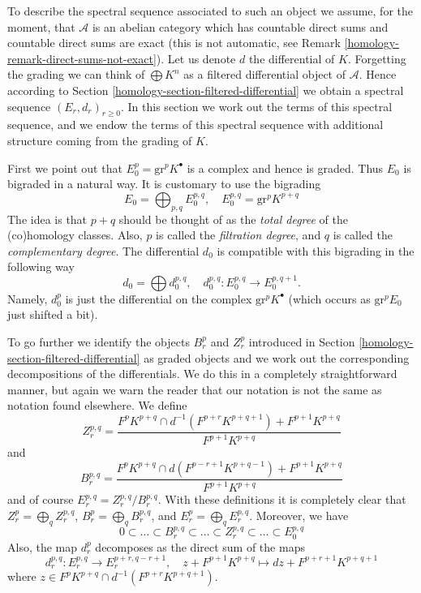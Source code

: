 \medskip\noindent
To describe the spectral sequence associated to such an object
we assume, for the moment, that $\mathcal{A}$ is an abelian category
which has countable direct sums and countable direct sums are exact
(this is not automatic, see Remark \ref{homology-remark-direct-sums-not-exact}).
Let us denote $d$ the differential of $K$. Forgetting the grading
we can think of $\bigoplus K^n$ as a filtered differential object of
$\mathcal{A}$. Hence according to Section \ref{homology-section-filtered-differential}
we obtain a spectral sequence $(E_r, d_r)_{r \geq 0}$. In this section
we work out the terms of this spectral sequence, and we endow the terms
of this spectral sequence with additional structure coming from the
grading of $K$.

\medskip\noindent
First we point out that $E_0^p = \text{gr}^p K^\bullet$ is a
complex and hence is graded. Thus $E_0$ is bigraded in a natural
way. It is customary to use the bigrading
$$
E_0 = \bigoplus\nolimits_{p, q} E_0^{p, q},
\quad
E_0^{p, q} = \text{gr}^p K^{p + q}
$$
The idea is that $p + q$ should be thought of as the {\it total degree} of
the (co)homology classes. Also, $p$ is called the {\it filtration degree},
and $q$ is called the {\it complementary degree}.
The differential $d_0$ is compatible with this
bigrading in the following way
$$
d_0  = \bigoplus d_0^{p, q},
\quad
d_0^{p, q} : E_0^{p, q} \to E_0^{p, q + 1}.
$$
Namely, $d_0^p$ is just the differential on the complex
$\text{gr}^p K^\bullet$ (which occurs as $\text{gr}^pE_0$ just shifted
a bit).

\medskip\noindent
To go further we identify the objects $B_r^p$ and $Z_r^p$ introduced
in Section \ref{homology-section-filtered-differential} as graded objects and
we work out the corresponding decompositions of the differentials.
We do this in a completely straightforward manner, but again we warn
the reader that our notation is not the same as notation found
elsewhere. We define
$$
Z_r^{p, q} =
\frac{F^pK^{p + q} \cap d^{-1}(F^{p + r}K^{p + q + 1}) + F^{p + 1}K^{p + q}}
{F^{p + 1}K^{p + q}}
$$
and
$$
B_r^{p, q} =
\frac{F^pK^{p + q} \cap d(F^{p - r + 1}K^{p + q - 1}) + F^{p + 1}K^{p + q}}
{F^{p + 1}K^{p + q}}
$$
and of course $E_r^{p, q} = Z_r^{p, q}/B_r^{p, q}$.
With these definitions it is completely clear that
$Z_r^p = \bigoplus_q Z_r^{p, q}$,
$B_r^p = \bigoplus_q B_r^{p, q}$, and
$E_r^p = \bigoplus_q E_r^{p, q}$. Moreover, we have
$$
0 \subset \ldots \subset B_r^{p, q} \subset
\ldots
\subset Z_r^{p, q} \subset \ldots \subset E_0^{p, q}
$$
Also, the map $d_r^p$ decomposes as the direct sum of the maps
$$
d_r^{p, q} : E_r^{p, q} \longrightarrow E_r^{p + r, q - r + 1},
\quad
z + F^{p + 1}K^{p + q}
\mapsto
dz + F^{p + r + 1}K^{p + q + 1}
$$
where $z \in F^pK^{p + q} \cap d^{-1}(F^{p + r}K^{p + q + 1})$.

